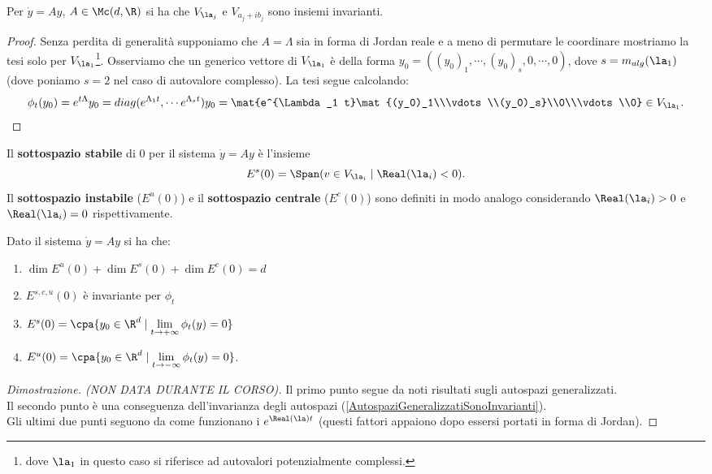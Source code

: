 \begin{proposition}\label{AutospaziGeneralizzatiSonoInvarianti}
Per $\dot y=Ay$, $A\in\Mc(d,\R)$ si ha che $V_{\la_j}$ e $V_{a_j+ib_j}$ sono insiemi invarianti.
\end{proposition}
\begin{proof}
Senza perdita di generalit\`a supponiamo che $A=\Lambda$ sia in forma di Jordan reale e a meno di permutare le coordinare mostriamo la tesi solo per $V_{\la_1}$\footnote{dove $\la_1$ in questo caso si riferisce ad autovalori potenzialmente complessi.}. Osserviamo che un generico vettore di $V_{\la_1}$ \`e della forma $y_0=((y_0)_1,\cdots, (y_0)_s, 0,\cdots, 0)$, dove $s=m_{alg}(\la_1)$ (dove poniamo $s=2$ nel caso di autovalore complesso). La tesi segue calcolando: 
\[\phi_t(y_0)=e^{t\Lambda}y_0=diag(e^{\Lambda_1 t},\cdots e^{\Lambda_s t})y_0=\mat{e^{\Lambda_1 t}\mat{(y_0)_1\\\vdots\\(y_0)_s}\\0\\\vdots\\0}\in V_{\la_1}.\]
\end{proof}

\begin{definition}
Il \textbf{sottospazio stabile} di $0$ per il sistema $\dot y=Ay$ \`e l'insieme
\[E^s(0)=\Span(v\in V_{\la_i}\mid \Real(\la_i)<0).\]
Il \textbf{sottospazio instabile} ($E^u(0)$) e il \textbf{sottospazio centrale} ($E^c(0)$) sono definiti in modo analogo considerando $\Real(\la_i)>0$ e $\Real(\la_i)=0$ rispettivamente.
\end{definition}

\begin{theorem}
Dato il sistema $\dot y=Ay$ si ha che:
\begin{enumerate}
\item $\dim E^u(0)+\dim E^s(0)+\dim E^c(0)=d$
\item $E^{s,c,u}(0)$ \`e invariante per $\phi_t$
\item $E^s(0)=\cpa{y_0\in\R^d\mid \displaystyle\lim_{t\to+\infty}\phi_t(y)=0}$
\item $E^u(0)=\cpa{y_0\in\R^d\mid \displaystyle\lim_{t\to-\infty}\phi_t(y)=0}$.
\end{enumerate}
\end{theorem}
\begin{proof}[Dimostrazione. (NON DATA DURANTE IL CORSO)]
Il primo punto segue da noti risultati sugli autospazi generalizzati.\\
Il secondo punto \`e una conseguenza dell'invarianza degli autospazi (\ref{AutospaziGeneralizzatiSonoInvarianti}).\\
Gli ultimi due punti seguono da come funzionano i $e^{\Real(\la)t}$ (questi fattori appaiono dopo essersi portati in forma di Jordan).
\end{proof}

